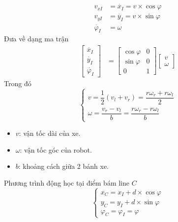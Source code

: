           \begin{align*}
               v_{xI} &= \dot{x_I} = v \times \cos \varphi\\
               v_{yI} &= \dot{y_I} = v \times \sin \varphi\\
               \dot{\varphi_I} &= \omega
          \end{align*} 
          Đưa về dạng ma trận
          \begin{align}
               \begin{bmatrix}
                    \dot{x_I} \\
                    \dot{y_I} \\
                    \dot{\varphi_I}
                    \end{bmatrix} &= \begin{bmatrix}
                    \cos\varphi & 0 \\
                    \sin\varphi & 0 \\
                    0 & 1
                    \end{bmatrix} \begin{bmatrix}
                    v \\
                    \omega
               \end{bmatrix}
               \label{c5_e1}
          \end{align}
          \hspace*{0.6cm}Trong đó
          \begin{equation*}
               \begin{cases}
                    v = \dfrac{1}{2}(v_l + v_r) = \dfrac{r\omega_r + r\omega_l}{2} \\[0.5em]
                    \omega = \dfrac{v_r - v_l}{b} = \dfrac{r\omega_r - r\omega_l}{b}
               \end{cases}               
          \end{equation*}
          \begin{itemize}
               \item $v$: vận tốc dài của xe.
               \item $\omega$: vận tốc góc của robot.
               \item $b$: khoảng cách giữa 2 bánh xe.
          \end{itemize}
          \hspace*{0.6cm}Phương trình động học tại điểm bám line $C$
          \begin{equation}
               \begin{cases}
                    x_C = x_I + d \times \cos \varphi \\[0.5em]
                    y_C = y_I + d \times \sin \varphi \\[0.5em]
                    \varphi_C = \varphi_I = \varphi
               \end{cases}   
               \label{c5_e2}            
          \end{equation}
